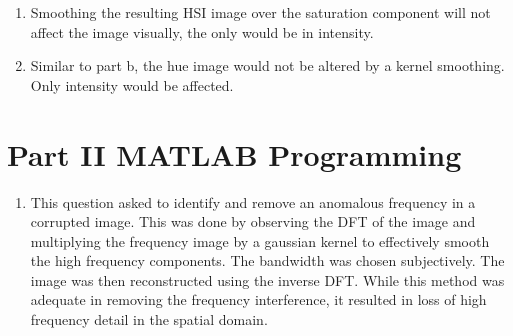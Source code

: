 \documentclass{article}[12 pt]
\begin{document}
\begin{enumerate}
\begin{enumerate}[label=\alph*]
		\item Smoothing the resulting HSI image over the saturation component will not affect the image visually, the only would be in intensity. 

		\item Similar to part b, the hue image would not be altered by a kernel smoothing.  Only intensity would be affected.
	\end{enumerate}

\end{enumerate}

\section*{Part II MATLAB Programming}
\begin{enumerate}
\item This question asked to identify and remove an anomalous frequency in a corrupted image.  This was done by observing the DFT of the image and multiplying the frequency image by a gaussian kernel to effectively smooth the high frequency components.  The bandwidth was chosen subjectively.  The image was then reconstructed using the inverse DFT.  While this method was adequate in removing the frequency interference, it resulted in loss of high frequency detail in the spatial domain.


\end{enumerate}
\end{document}
